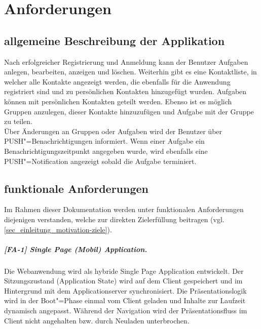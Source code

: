 \chapter{Anforderungen}
\label{chp_anforderungen}

\section{allgemeine Beschreibung der Applikation}
\label{sec_anfroderungen_allgemeine-beschreibung}

Nach erfolgreicher Registrierung und Anmeldung kann der Benutzer Aufgaben anlegen, bearbeiten, anzeigen und löschen. Weiterhin gibt es eine Kontaktliste, in welcher alle Kontakte angezeigt werden, die ebenfalls für die Anwendung registriert sind und zu persönlichen Kontakten hinzugefügt wurden. Aufgaben können mit persönlichen Kontakten geteilt werden. Ebenso ist es möglich Gruppen anzulegen, dieser Kontakte hinzuzufügen und Aufgabe mit der Gruppe zu teilen. \\

Über Änderungen an Gruppen oder Aufgaben wird der Benutzer über PUSH"=Benachrichtigungen informiert. Wenn einer Aufgabe ein Benachrichtigungszeitpunkt angegeben wurde, wird ebenfalls eine PUSH"=Notification angezeigt sobald die Aufgabe terminiert.


\newpage
\section{funktionale Anforderungen}
\label{sec_anforderungen_funktionale-anforderungen}

Im Rahmen dieser Dokumentation werden unter funktionalen Anforderungen diejenigen verstanden, welche zur direkten Zielerfüllung beitragen (vgl. \ref{sec_einleitung_motivation-ziele}).


\paragraph{[FA-1] Single Page (Mobil) Application.} Die Webanwendung wird als hybride Single Page Application entwickelt. Der Sitzungszustand (\glqq Application State\grqq) wird auf dem Client gespeichert und im Hintergrund mit dem Applicationserver synchronisiert. Die Präsentationslogik wird in der \glqq Boot"=Phase\grqq{} einmal vom Client geladen und Inhalte zur Laufzeit dynamisch angepasst. Während der Navigation wird der Präsentationsfluss im Client nicht angehalten bzw. durch \glqq Neuladen\grqq{} unterbrochen.

